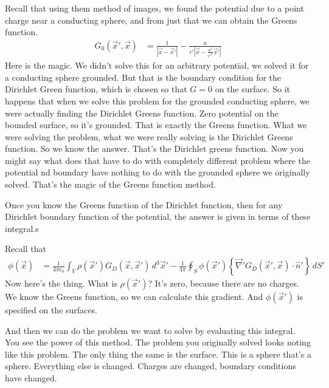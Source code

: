 Recall that using them method of images,
we found the potential due to a point charge near a conducting sphere,
and from just that we can obtain the Greens function.
\begin{align}
    G_0\left( \vec{x}', \vec{x} \right)
    &=
    \frac{1}{\left| \vec{x} - \vec{x}'\right|}
    -
    \frac{a}{r'\left|
    \vec{x}
    -
    \frac{a^2}{r'^2}\vec{x}'
    \right|}
\end{align}
Here is the magic.
We didn't solve this for an arbitrary potential,
we solved it for a conducting sphere grounded.
But that is the boundary condition for the Dirichlet Green function,
which is chosen so that $G=0$ on the surface.
So it happens that when we solve this problem for the grounded conducting
sphere,
we were actually finding the Dirichlet Greens function.
Zero potential on the bounded surface,
so it's grounded.
That is exactly the Greens function.
What we were solving the problem,
what we were really solving is the Dirichlet Greens function.
So we know the answer.
That's the Dirichlet greens function.
Now you might say what does that have to do with  completely different
problem where the potential nd boundary have nothing to do with the grounded
sphere we originally solved.
That's the magic of the Greens function method.

Once you know the Greens function of the Dirichlet function,
then for any Dirichlet boundary function of the potential,
the answer is given in terms of these integral.s

Recall that
\begin{align}
    \phi\left( \vec{x} \right)
    &=
    \frac{1}{4\pi\epsilon_0}
    \int_V 
    \rho\left( \vec{x}' \right)
    G_D\left( \vec{x},\vec{x}' \right)
    \, d^3\vec{x}'
    -
    \frac{1}{4\pi}
    \oint_S
    \phi\left( \vec{x}' \right)
    \left\{ 
    \vec{\nabla}' G_D \left( \vec{x}', \vec{x} \right)
    \cdot \hat{n}'
    \right\}
    \,dS'
\end{align}
Now here's the thing.
What is $\rho\left( \vec{x}' \right)$?
It's zero, because there are no charges.
We know the Greens function,
so we can calculate this gradient.
And $\phi(\vec{x}')$ is specified on the surfaces.

And then we can do the problem we want to solve by evaluating this integral.
You see the power of this method.
The problem you originally solved looks noting like this problem.
The only thing the same is the surface.
This is a sphere
that's a sphere.
Everything else is changed.
Charges are changed,
boundary conditions have changed.

